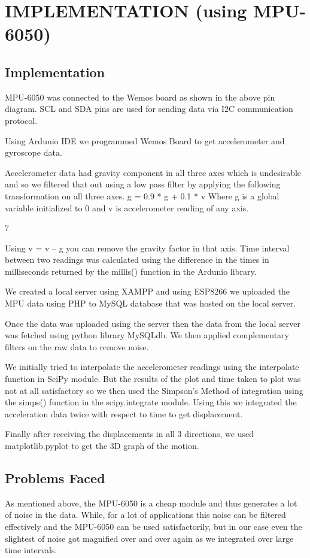 \chapter{IMPLEMENTATION (using MPU-6050)}
\label{chap:MoreStuff}

\section{Implementation}
MPU-6050 was connected to the Wemos board as shown in the above
pin diagram. SCL and SDA pins are used for sending data via I2C
communication protocol.

Using Ardunio IDE we programmed Wemos Board to get accelerometer
and gyroscope data.

Accelerometer data had gravity component in all three axes which is
undesirable and so we filtered that out using a low pass filter by applying
the following transformation on all three axes.
g = 0.9 * g + 0.1 * v
Where g is a global variable initialized to 0 and v is accelerometer reading
of any axis.

7

Using v = v – g you can remove the gravity factor in that axis.
Time interval between two readings was calculated using the difference
in the times in milliseconds returned by the millis() function in the Ardunio
library.

We created a local server using XAMPP and using ESP8266 we uploaded
the MPU data using PHP to MySQL database that was hosted on the local
server.

Once the data was uploaded using the server then the data from the local
server was fetched using python library MySQLdb. We then applied
complementary filters on the raw data to remove noise.

We initially tried to interpolate the accelerometer readings using the
interpolate function in SciPy module. But the results of the plot and time
taken to plot was not at all satisfactory so we then used the Simpson’s
Method of integration using the simps() function in the scipy.integrate
module. Using this we integrated the acceleration data twice with respect
to time to get displacement.

Finally after receiving the displacements in all 3 directions, we used
matplotlib.pyplot to get the 3D graph of the motion.

\section{Problems Faced}
As mentioned above, the MPU-6050 is a cheap module and thus
generates a lot of noise in the data. While, for a lot of applications this
noise can be filtered effectively and the MPU-6050 can be used
satisfactorily, but in our case even the slightest of noise got magnified over
and over again as we integrated over large time intervals.

